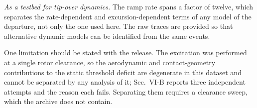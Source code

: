 \emph{As a testbed for tip-over dynamics.} The ramp rate spans a factor
of twelve, which separates the rate-dependent and excursion-dependent
terms of any model of the departure, not only the one used here. The
raw traces are provided so that alternative dynamic models can be
identified from the same events.

One limitation should be stated with the release. The excitation was
performed at a single rotor clearance, so the aerodynamic and
contact-geometry contributions to the static threshold deficit are
degenerate in this dataset and cannot be separated by any analysis of
it; Sec.~VI-B reports three independent attempts and the reason each
fails. Separating them requires a clearance sweep, which the archive
does not contain.

